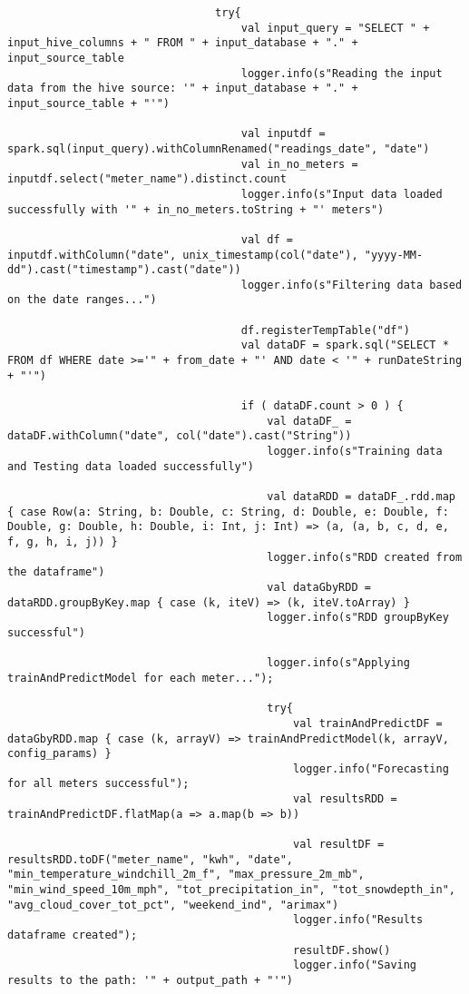 \documentclass[12pt]{article}
\begin{document}
\begin{lstlisting}
       							try{
       								val input_query = "SELECT " + input_hive_columns + " FROM " + input_database + "." + input_source_table 
       								logger.info(s"Reading the input data from the hive source: '" + input_database + "." + input_source_table + "'")
    
       								val inputdf = spark.sql(input_query).withColumnRenamed("readings_date", "date")
       								val in_no_meters = inputdf.select("meter_name").distinct.count
       								logger.info(s"Input data loaded successfully with '" + in_no_meters.toString + "' meters")
    
       								val df = inputdf.withColumn("date", unix_timestamp(col("date"), "yyyy-MM-dd").cast("timestamp").cast("date"))
       								logger.info(s"Filtering data based on the date ranges...")
    
       								df.registerTempTable("df")
       								val dataDF = spark.sql("SELECT * FROM df WHERE date >='" + from_date + "' AND date < '" + runDateString + "'")
    
       								if ( dataDF.count > 0 ) {
       									val dataDF_ = dataDF.withColumn("date", col("date").cast("String"))
       									logger.info(s"Training data and Testing data loaded successfully")
    
       									val dataRDD = dataDF_.rdd.map { case Row(a: String, b: Double, c: String, d: Double, e: Double, f: Double, g: Double, h: Double, i: Int, j: Int) => (a, (a, b, c, d, e, f, g, h, i, j)) }
       									logger.info(s"RDD created from the dataframe")
       									val dataGbyRDD = dataRDD.groupByKey.map { case (k, iteV) => (k, iteV.toArray) }
       									logger.info(s"RDD groupByKey successful")
    
       									logger.info(s"Applying trainAndPredictModel for each meter...");
    
       									try{
       										val trainAndPredictDF = dataGbyRDD.map { case (k, arrayV) => trainAndPredictModel(k, arrayV, config_params) }
       										logger.info("Forecasting for all meters successful");
       										val resultsRDD = trainAndPredictDF.flatMap(a => a.map(b => b))
    
       										val resultDF = resultsRDD.toDF("meter_name", "kwh", "date", "min_temperature_windchill_2m_f", "max_pressure_2m_mb", "min_wind_speed_10m_mph", "tot_precipitation_in", "tot_snowdepth_in", "avg_cloud_cover_tot_pct", "weekend_ind", "arimax")
       										logger.info("Results dataframe created");
       										resultDF.show()
       										logger.info("Saving results to the path: '" + output_path + "'")
    

\end{lstlisting}
\end{document}
